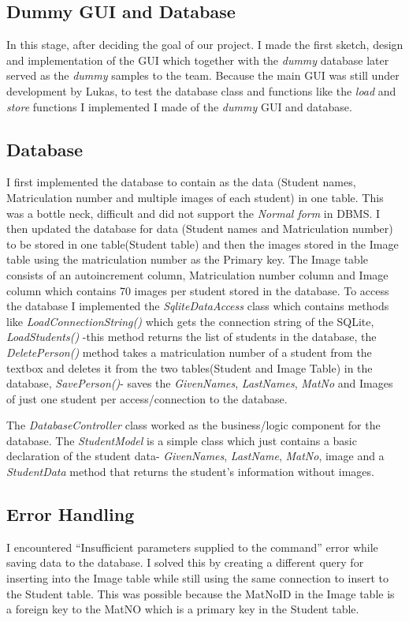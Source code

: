 \documentclass[12pt, a4paper]{article}
\begin{document}
\subsection{Dummy GUI and Database}
In this stage, after deciding the goal of our project. I made the first sketch, design and implementation of the GUI which together with the \textit{dummy} database later served as the \textit{dummy} samples to the team. Because the main GUI was still under development by Lukas, to test the database class and functions like the \textit{load} and \textit{store} functions I implemented I made of the \textit{dummy} GUI and database. 

\subsection{Database}
I first implemented the database to contain as the data (Student names, Matriculation number and multiple images of each student) in one table. This was a bottle neck, difficult and did not support the \textit{Normal form} in DBMS. I then updated the database for data (Student names and Matriculation number) to be stored in one table(Student table) and then the images stored in the Image table using the matriculation number as the Primary key. The Image table consists of an autoincrement column, Matriculation number column and Image column which contains 70 images per student stored in the database.
To access the database I implemented the \textit{SqliteDataAccess} class which contains methods like \textit{LoadConnectionString()} which gets the connection string of the SQLite, \textit{LoadStudents()} -this method returns the list of students in the database, the \textit{DeletePerson()} method takes a matriculation number of a student from the textbox and deletes it from the two tables(Student and Image Table) in the database, \textit{SavePerson()}- saves the \textit{GivenNames}, \textit{LastNames}, \textit{MatNo} and Images of just one student per access/connection to the database.

The \textit{DatabaseController} class worked as the business/logic component for the database. The \textit{StudentModel} is a simple class which just contains a basic declaration of the student data- \textit{GivenNames}, \textit{LastName}, \textit{MatNo}, image and a \textit{StudentData} method that returns the student’s information without images.

\subsection{Error Handling}
I encountered “Insufficient parameters supplied to the command” error while saving data to the database. I solved this by creating a different query for inserting into the Image table while still using the same connection to insert to the Student table. This was possible because the MatNoID in the Image table is a foreign key to the MatNO which is a primary key in the Student table.
\end{document}
